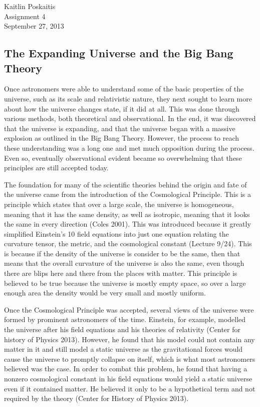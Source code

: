 \documentclass[12pt]{article}
\begin{document}
\noindent Kaitlin Poskaitis\\
Assignment 4\\
September 27, 2013
\begin{center}
\section*{\bf The Expanding Universe and the Big Bang Theory}
\end{center}

Once astronomers were able to understand some of the basic properties of the
universe, such as its scale and relativistic nature, they next sought to learn
more about how the universe changes state, if it did at all.  This was done
through various methods, both theoretical and observational.  In the end, it was
discovered that the universe is expanding, and that the universe began with a
massive explosion as outlined in the Big Bang Theory.  However, the process to
reach these understanding was a long one and met much opposition during the
process.  Even so, eventually observational evident became so overwhelming that
these principles are still accepted today.

The foundation for many of the scientific theories behind the origin and fate of
the universe came from the introduction of the Cosmological Principle.  This is
a principle which states that over a large scale, the universe is homogeneous,
meaning that it has the same density, as well as isotropic, meaning that it
looks the same in every direction (Coles 2001).  This was introduced because it
greatly simplified Einstein's 10 field equations into just one equation
relating the curvature tensor, the metric, and the cosmological constant
(Lecture 9/24).  This is because if the density of the universe is consider to
be the same, then that means that the overall curvature of the universe is also
the same, even though there are blips here and there from the places with
matter. This principle is believed to be true because the universe is
mostly empty space, so over a large enough area the density would be very small
and mostly uniform.

Once the Cosmological Principle was accepted, several views of the universe were
formed by prominent astronomers of the time.  Einstein, for example, modelled
the universe after his field equations and his theories of relativity (Center
for history of Physics 2013).  However,
he found that his model could not contain any matter in it and still model a
static universe as the gravitational forces would cause the universe to promptly
collapse on itself, which is what most astronomers believed was the case.  In
order
to combat this problem, he found that having a nonzero cosmological constant in
his field equations would yield a static universe even if it contained matter.
He believed it only to be a hypothetical term and not required by the theory
(Center for History of Physics 2013).
\end{document}
